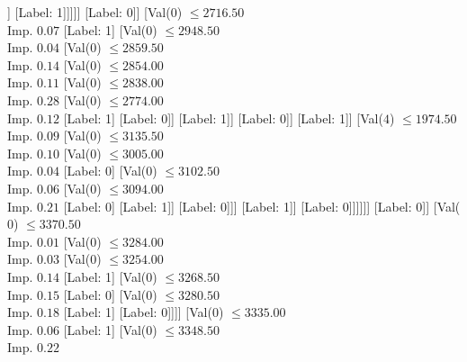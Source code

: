 \documentclass[margin=10pt]{standalone}
\begin{document}
\begin{forest}
														[Label: 1]
														[Val($0$) $ \leq 2536.50$ \\ Imp. $0.04$
															[Label: 0]
															[Val($0$) $ \leq 2546.50$ \\ Imp. $0.01$
																[Val($0$) $ \leq 2539.50$ \\ Imp. $0.11$
																	[Label: 1]
																	[Label: 0]]
																[Label: 1]]]]]
												[Label: 0]]
											[Val($0$) $ \leq 2716.50$ \\ Imp. $0.07$
												[Label: 1]
												[Val($0$) $ \leq 2948.50$ \\ Imp. $0.04$
													[Val($0$) $ \leq 2859.50$ \\ Imp. $0.14$
														[Val($0$) $ \leq 2854.00$ \\ Imp. $0.11$
															[Val($0$) $ \leq 2838.00$ \\ Imp. $0.28$
																[Val($0$) $ \leq 2774.00$ \\ Imp. $0.12$
																	[Label: 1]
																	[Label: 0]]
																[Label: 1]]
															[Label: 0]]
														[Label: 1]]
													[Val($4$) $ \leq 1974.50$ \\ Imp. $0.09$
														[Val($0$) $ \leq 3135.50$ \\ Imp. $0.10$
															[Val($0$) $ \leq 3005.00$ \\ Imp. $0.04$
																[Label: 0]
																[Val($0$) $ \leq 3102.50$ \\ Imp. $0.06$
																	[Val($0$) $ \leq 3094.00$ \\ Imp. $0.21$
																		[Label: 0]
																		[Label: 1]]
																	[Label: 0]]]
															[Label: 1]]
														[Label: 0]]]]]]
									[Label: 0]]
								[Val($0$) $ \leq 3370.50$ \\ Imp. $0.01$
									[Val($0$) $ \leq 3284.00$ \\ Imp. $0.03$
										[Val($0$) $ \leq 3254.00$ \\ Imp. $0.14$
											[Label: 1]
											[Val($0$) $ \leq 3268.50$ \\ Imp. $0.15$
												[Label: 0]
												[Val($0$) $ \leq 3280.50$ \\ Imp. $0.18$
													[Label: 1]
													[Label: 0]]]]
										[Val($0$) $ \leq 3335.00$ \\ Imp. $0.06$
											[Label: 1]
											[Val($0$) $ \leq 3348.50$ \\ Imp. $0.22$

\end{forest}
\end{document}

